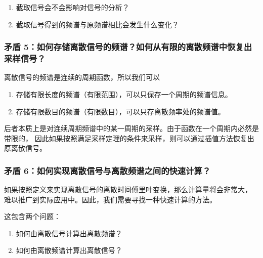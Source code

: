 \begin{enumerate}[label=(\arabic*)]
    \item 截取信号会不会影响对信号的分析？
    \item 截取信号得到的频谱与原频谱相比会发生什么变化？
\end{enumerate}

\subsubsection{矛盾 5：如何存储离散信号的频谱？如何从有限的离散频谱中恢复出采样信号？}

离散信号的频谱是连续的周期函数，所以我们可以
\begin{enumerate}[label=(\arabic*)]
    \item 存储有限长度的频谱（有限范围），可以只保存一个周期的频谱信息。
    \item 存储有限数目的频谱（有限数目），可以只存离散频率处的频谱值。
\end{enumerate}

后者本质上是对连续周期频谱中的某一周期的采样。由于函数在一个周期内必然是带限的，
因此如果按照满足采样定理的条件来采样，则可以通过插值方法恢复出原离散信号。

\subsubsection{矛盾 6：如何实现离散信号与离散频谱之间的快速计算？}

如果按照定义来实现离散信号的离散时间傅里叶变换，那么计算量将会非常大，
难以推广到实际应用中。因此，我们需要寻找一种快速计算的方法。

这包含两个问题：
\begin{enumerate}[label=(\arabic*)]
    \item 如何由离散信号计算出离散频谱？
    \item 如何由离散频谱计算出离散信号？
\end{enumerate}
